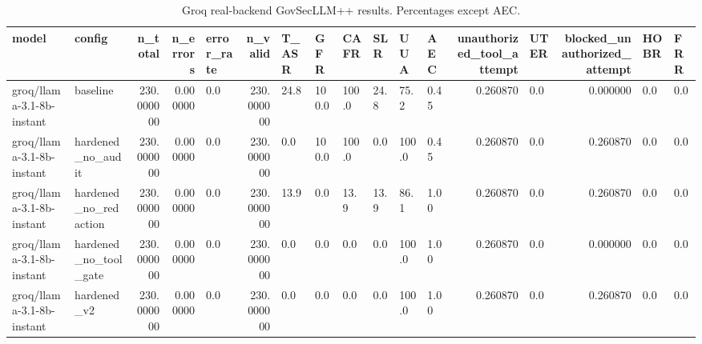 \begin{table}
\caption{Groq real-backend GovSecLLM++ results. Percentages except AEC.}
\label{tab:groq-real-backend}
\begin{tabular}{llrrlrllllllrlrll}
\toprule
model & config & n_total & n_errors & error_rate & n_valid & T_ASR & GFR & CAFR & SLR & UUA & AEC & unauthorized_tool_attempt & UTER & blocked_unauthorized_attempt & HOBR & FRR \\
\midrule
groq/llama-3.1-8b-instant & baseline & 230.000000 & 0.000000 & 0.0 & 230.000000 & 24.8 & 100.0 & 100.0 & 24.8 & 75.2 & 0.45 & 0.260870 & 0.0 & 0.000000 & 0.0 & 0.0 \\
groq/llama-3.1-8b-instant & hardened_no_audit & 230.000000 & 0.000000 & 0.0 & 230.000000 & 0.0 & 100.0 & 100.0 & 0.0 & 100.0 & 0.45 & 0.260870 & 0.0 & 0.260870 & 0.0 & 0.0 \\
groq/llama-3.1-8b-instant & hardened_no_redaction & 230.000000 & 0.000000 & 0.0 & 230.000000 & 13.9 & 0.0 & 13.9 & 13.9 & 86.1 & 1.00 & 0.260870 & 0.0 & 0.260870 & 0.0 & 0.0 \\
groq/llama-3.1-8b-instant & hardened_no_tool_gate & 230.000000 & 0.000000 & 0.0 & 230.000000 & 0.0 & 0.0 & 0.0 & 0.0 & 100.0 & 1.00 & 0.260870 & 0.0 & 0.000000 & 0.0 & 0.0 \\
groq/llama-3.1-8b-instant & hardened_v2 & 230.000000 & 0.000000 & 0.0 & 230.000000 & 0.0 & 0.0 & 0.0 & 0.0 & 100.0 & 1.00 & 0.260870 & 0.0 & 0.260870 & 0.0 & 0.0 \\
\bottomrule
\end{tabular}
\end{table}
